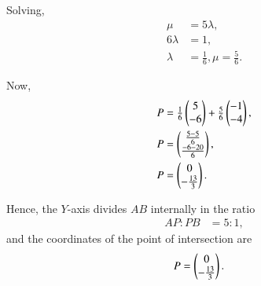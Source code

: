 \documentclass[journal]{IEEEtran}
\begin{document}
Solving,
\begin{align}
\mu &= 5\lambda, \\
6\lambda &= 1, \\
\lambda &= \tfrac{1}{6},  \mu = \tfrac{5}{6}.
\end{align}

Now,
\begin{align}
P &= \tfrac{1}{6}\begin{pmatrix}5 \\ -6\end{pmatrix} + \tfrac{5}{6}\begin{pmatrix}-1 \\ -4\end{pmatrix}, \\
P &= \begin{pmatrix}\tfrac{5-5}{6} \\ \tfrac{-6-20}{6}\end{pmatrix}, \\
P &= \begin{pmatrix}0 \\ -\tfrac{13}{3}\end{pmatrix}.
\end{align}

Hence, the $Y$-axis divides $AB$ internally in the ratio
\begin{align}
AP:PB &= 5:1,
\end{align}
and the coordinates of the point of intersection are
\begin{align}
P &= \begin{pmatrix}0 \\ -\tfrac{13}{3}\end{pmatrix}.
\end{align}
\end{document}
